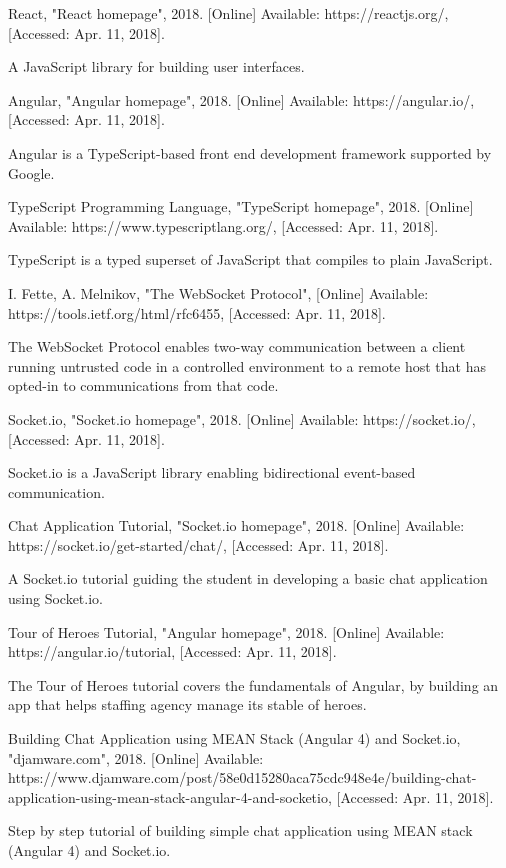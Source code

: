 \documentclass[11pt,a4paper]{report}
\begin{document}
\begin{thebibliography}{1}
 React, "React homepage", 2018. [Online] Available: https://reactjs.org/, [Accessed: Apr. 11, 2018].

  A JavaScript library for building user interfaces.

 Angular, "Angular homepage", 2018. [Online] Available: https://angular.io/, [Accessed: Apr. 11, 2018].

  Angular is a TypeScript-based front end development framework supported by Google.

 TypeScript Programming Language, "TypeScript homepage", 2018. [Online] Available: https://www.typescriptlang.org/, [Accessed: Apr. 11, 2018].

  TypeScript is a typed superset of JavaScript that compiles to plain JavaScript.

 I. Fette, A. Melnikov, "The WebSocket Protocol", [Online] Available: https://tools.ietf.org/html/rfc6455, [Accessed: Apr. 11, 2018].

  The WebSocket Protocol enables two-way communication between a client running untrusted code in a controlled environment to a remote host
  that has opted-in to communications from that code.

 Socket.io, "Socket.io homepage", 2018. [Online] Available: https://socket.io/, [Accessed: Apr. 11, 2018].

  Socket.io is a JavaScript library enabling bidirectional event-based communication.

 Chat Application Tutorial, "Socket.io homepage", 2018. [Online] Available: https://socket.io/get-started/chat/, [Accessed: Apr. 11, 2018].

  A Socket.io tutorial guiding the student in developing a basic chat application using Socket.io.

 Tour of Heroes Tutorial, "Angular homepage", 2018. [Online] Available: https://angular.io/tutorial, [Accessed: Apr. 11, 2018].

  The Tour of Heroes tutorial covers the fundamentals of Angular, by building an app that helps staffing agency manage its stable of heroes.

 Building Chat Application using MEAN Stack (Angular 4) and Socket.io, "djamware.com", 2018.
  [Online] Available: https://www.djamware.com/post/58e0d15280aca75cdc948e4e/building-chat-application-using-mean-stack-angular-4-and-socketio,
  [Accessed: Apr. 11, 2018].

  Step by step tutorial of building simple chat application using MEAN stack (Angular 4) and Socket.io.

\end{thebibliography}
\end{document}

